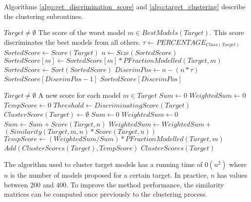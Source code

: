 Algorithms \ref{algo:get_discrimination_score} and \ref{algo:target_clustering} describe the clustering subroutines.
\begin{algorithm}
\caption{$DiscriminatingScore(Target)$}
\label{algo:get_discrimination_score} 
\begin{algorithmic}[1]
\REQUIRE $Target \neq \emptyset$
\ENSURE The score of the worst model $m \in BestModels(Target)$. This score discriminates the best models from all others.
\STATE $\tau \leftarrow PERCENTAGE_{Class(Target)}$
\COMMENT{$PERCENTAGE_{Class(Target)} \in (0,1]$ is the optimized percentage referred to the $Target$ class. Classes are FM, TBM and HQM.}
\STATE $SortedScore \leftarrow Score(Target)$
\STATE $n \leftarrow Size(SortedScore)$
	\STATE $SortedScore[m] \leftarrow SortedScore[m] * PFractionModelled(Target, m)$
\ENDFOR
\STATE $SortedScore \leftarrow Sort(SortedScore)$
\STATE $DiscrimPos \leftarrow n - (n * \tau)$
	\RETURN $SortedScore[DiscrimPos - 1]$
\ENDIF
\RETURN $SortedScore[DiscrimPos]$
\end{algorithmic}
\end{algorithm}
\begin{algorithm}
\caption{$Clustering(Target)$}
\label{algo:target_clustering}
\begin{algorithmic}[1]
\REQUIRE $Target \neq \emptyset$
\ENSURE A new score for each model $m \in Target$
\STATE $Sum \leftarrow 0$
\STATE $WeightedSum \leftarrow 0$
\STATE $TempScore \leftarrow 0$
\STATE $Threshold \leftarrow DiscriminatingScore(Target)$
\STATE $ClusterScore(Target) \leftarrow \emptyset$
	\STATE $Sum \leftarrow 0$
	\STATE $WeightedSum \leftarrow 0$
			\STATE $Sum \leftarrow Sum + Score(Target, n)$
			\STATE $WeightedSum \leftarrow WeightedSum + $\\
			       $(Similarity(Target, m, n) * Score(Target, n))$
		\ENDIF
	\ENDFOR
	\STATE $TempScore \leftarrow (WeightedSum / Sum) * PFractionModelled(Target, m)$
	\STATE $Add(ClusterScores(Target), TempScore)$
\ENDFOR
\RETURN $ClusterScores(Target)$
\end{algorithmic}
\end{algorithm}
The algorithm used to cluster target models has a running time of $0(n^{2})$ where $n$ is the number of models proposed for a certain target. In practice, $n$ has values between $200$ and $400$. To improve the method performance, the similarity matrices can be computed once previously to the clustering process.



